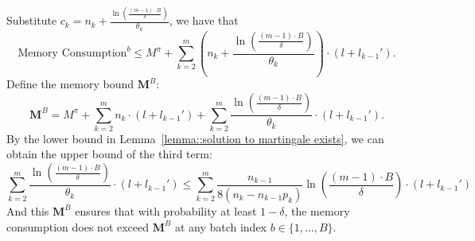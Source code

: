 Substitute \(c_k = n_k + \frac{\ln\left( \frac{(m - 1) \cdot B}{\delta} \right)}{\theta_k} \), we have that
$$    \text{Memory Consumption}^b \leq M^{\pi} + \sum_{k=2}^m \left( n_k + \frac{\ln\left( \frac{(m - 1) \cdot B}{\delta} \right)}{\theta_k} \right) \cdot (l + l_{k-1}').$$
Define the memory bound \( \mathbf{M}^B \):
$$\mathbf{M}^B = M^{\pi} + \sum_{k=2}^m n_k \cdot (l + l_{k-1}') + \sum_{k=2}^m \frac{\ln\left( \frac{(m - 1) \cdot B}{\delta} \right)}{\theta_k} \cdot (l + l_{k-1}').$$
By the lower bound in Lemma~\ref{lemma::solution to martingale exists}, we can obtain the upper bound of the third term:
$$\sum_{k=2}^m \frac{\ln\left( \frac{(m - 1) \cdot B}{\delta} \right)}{\theta_k} \cdot (l + l_{k-1}') \leq \sum_{k=2}^m \frac{n_{k-1}}{8(n_k - n_{k-1}p_k)}\ln\left( \frac{(m - 1) \cdot B}{\delta} \right)\cdot (l + l_{k-1}')$$
And this \( \mathbf{M}^B \) ensures that with probability at least \( 1 - \delta \), the memory consumption does not exceed \( \mathbf{M}^B \) at any batch index \( b \in \{1, \dots, B\} \).
